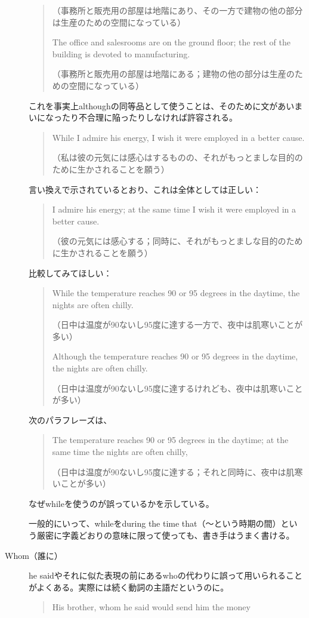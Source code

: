 \begin{description}
\begin{quote}
（事務所と販売用の部屋は地階にあり、その一方で建物の他の部分は生産のための空間になっている）

The office and salesrooms are on the ground floor; the rest of the
building is devoted to manufacturing.

（事務所と販売用の部屋は地階にある；建物の他の部分は生産のための空間になっている）
\end{quote}
これを事実上althoughの同等品として使うことは、そのために文があいまいになったり不合理に陥ったりしなければ許容される。
\begin{quote}
    While I admire his energy, I wish it were employed in a better
cause.

（私は彼の元気には感心はするものの、それがもっとましな目的のために生かされることを願う）

\end{quote}
言い換えで示されているとおり、これは全体としては正しい：
\begin{quote}
I admire his energy; at the same time I wish it were employed in a
better cause.

（彼の元気には感心する；同時に、それがもっとましな目的のために生かされることを願う）
\end{quote}
比較してみてほしい：
\begin{quote}
    While the temperature reaches 90 or 95 degrees in the daytime, the
nights are often chilly.

（日中は温度が90ないし95度に達する一方で、夜中は肌寒いことが多い）

Although the temperature reaches 90 or 95 degrees in the daytime,
the nights are often chilly.

（日中は温度が90ないし95度に達するけれども、夜中は肌寒いことが多い）
\end{quote}
次のパラフレーズは、
\begin{quote}
    The temperature reaches 90 or 95 degrees in the daytime; at the
same time the nights are often chilly,

（日中は温度が90ないし95度に達する；それと同時に、夜中は肌寒いことが多い）
\end{quote}
なぜwhileを使うのが誤っているかを示している。
\par 一般的にいって、whileをduring the time
that（～という時期の間）という厳密に字義どおりの意味に限って使っても、書き手はうまく書ける。
\item[Whom（誰に）]he
saidやそれに似た表現の前にあるwhoの代わりに誤って用いられることがよくある。実際には続く動詞の主語だというのに。
\begin{quote}
    His brother, whom he said would send him the money
    

\end{quote}
\end{description}
